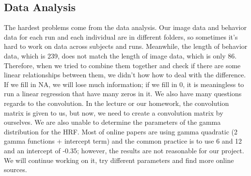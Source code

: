 \subsection{Data Analysis}
\noindent
The hardest problems come from the data analysis. Our image data and behavior data for each run and each individual are in different folders, so sometimes it's hard to work on data across subjects and runs.
Meanwhile, the length of behavior data, which is 239, does not match the length of image data, which is only 86. Therefore, when we tried to combine them together and check if there are some linear relationships between them, we didn't how how to deal with the difference. If we fill in NA, we will lose much information; if we fill in 0, it is meaningless to run a linear regression that have many zeros in it.
\noindent
We also have many questions regards to the convolution. In the lecture or our homework, the convolution matrix is given to us, but now, we need to create a convolution matrix by ourselves. We are also unable to determine the parameters of the gamma distribution for the HRF. Most of online papers are using gamma quadratic (2 gamma functions + intercept term) and the common practice is to use 6 and 12 and an intercept of -0.35; however, the results are not reasonable for our project. We will continue working on it, try different parameters and find more online sources.

